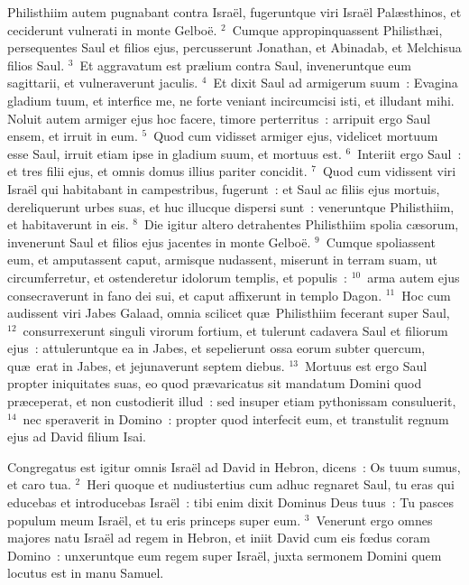 \lettrine[lines=3,image=true,loversize=0.05,lraise=-0.03]{P}{}hilisthiim autem pugnabant contra Isra\"el, fugeruntque viri Isra\"el Pal\ae sthinos, et ceciderunt vulnerati in monte Gelbo\"e.
${}^{2}$~Cumque appropinquassent Philisth\ae i, persequentes Saul et filios ejus, percusserunt Jonathan, et Abinadab, et Melchisua filios Saul.
${}^{3}$~Et aggravatum est pr\ae lium contra Saul, inveneruntque eum sagittarii, et vulneraverunt jaculis.
${}^{4}$~Et dixit Saul ad armigerum suum~: Evagina gladium tuum, et interfice me, ne forte veniant incircumcisi isti, et illudant mihi. Noluit autem armiger ejus hoc facere, timore perterritus~: arripuit ergo Saul ensem, et irruit in eum.
${}^{5}$~Quod cum vidisset armiger ejus, videlicet mortuum esse Saul, irruit etiam ipse in gladium suum, et mortuus est.
${}^{6}$~Interiit ergo Saul~: et tres filii ejus, et omnis domus illius pariter concidit.
${}^{7}$~Quod cum vidissent viri Isra\"el qui habitabant in campestribus, fugerunt~: et Saul ac filiis ejus mortuis, dereliquerunt urbes suas, et huc illucque dispersi sunt~: veneruntque Philisthiim, et habitaverunt in eis.
${}^{8}$~Die igitur altero detrahentes Philisthiim spolia c\ae sorum, invenerunt Saul et filios ejus jacentes in monte Gelbo\"e.
${}^{9}$~Cumque spoliassent eum, et amputassent caput, armisque nudassent, miserunt in terram suam, ut circumferretur, et ostenderetur idolorum templis, et populis~:
${}^{10}$~arma autem ejus consecraverunt in fano dei sui, et caput affixerunt in templo Dagon.
${}^{11}$~Hoc cum audissent viri Jabes Galaad, omnia scilicet qu\ae\ Philisthiim fecerant super Saul,
${}^{12}$~consurrexerunt singuli virorum fortium, et tulerunt cadavera Saul et filiorum ejus~: attuleruntque ea in Jabes, et sepelierunt ossa eorum subter quercum, qu\ae\ erat in Jabes, et jejunaverunt septem diebus.
${}^{13}$~Mortuus est ergo Saul propter iniquitates suas, eo quod pr\ae varicatus sit mandatum Domini quod pr\ae ceperat, et non custodierit illud~: sed insuper etiam pythonissam consuluerit,
${}^{14}$~nec speraverit in Domino~: propter quod interfecit eum, et transtulit regnum ejus ad David filium Isai.

\lettrine[lines=3,image=true,loversize=0.05,lraise=-0.03]{C}{}ongregatus est igitur omnis Isra\"el ad David in Hebron, dicens~: Os tuum sumus, et caro tua.
${}^{2}$~Heri quoque et nudiustertius cum adhuc regnaret Saul, tu eras qui educebas et introducebas Isra\"el~: tibi enim dixit Dominus Deus tuus~: Tu pasces populum meum Isra\"el, et tu eris princeps super eum.
${}^{3}$~Venerunt ergo omnes majores natu Isra\"el ad regem in Hebron, et iniit David cum eis fœdus coram Domino~: unxeruntque eum regem super Isra\"el, juxta sermonem Domini quem locutus est in manu Samuel.


